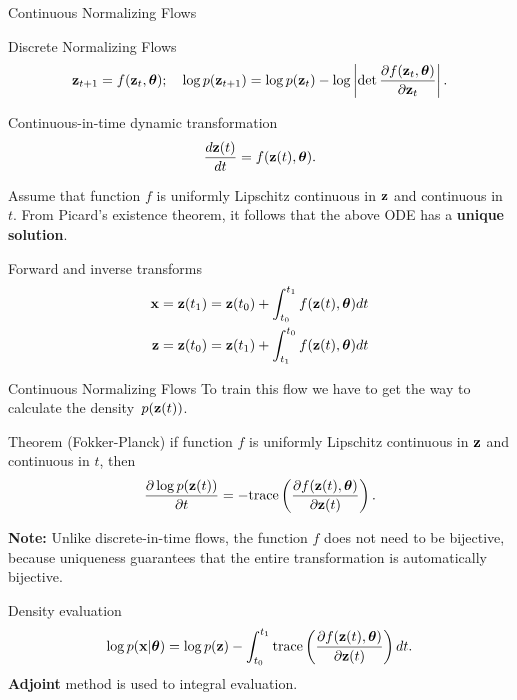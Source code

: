 \begin{frame}{Continuous Normalizing Flows}
	\begin{block}{Discrete Normalizing Flows}
		\vspace{-0.8cm}
		  \[
		  \mathbf{z}_{t+1} = f(\mathbf{z}_t, \boldsymbol{\theta}); \quad \log p(\mathbf{z}_{t+1}) = \log p(\mathbf{z}_{t}) - \log \left| \det \frac{\partial f(\mathbf{z}_t, \boldsymbol{\theta})}{\partial \mathbf{z}_{t}} \right| .
		  \]
		\vspace{-0.7cm}
	\end{block}
	\begin{block}{Continuous-in-time dynamic transformation}
		\vspace{-0.2cm}
		\[
			\frac{d\mathbf{z}(t)}{dt} = f(\mathbf{z}(t), \boldsymbol{\theta}).
		\]
		\vspace{-0.4cm}
	\end{block}
	Assume that function $f$ is uniformly Lipschitz continuous in $\mathbf{z}$ and continuous in $t$. From Picard’s existence theorem, it follows that the above ODE has a \textbf{unique solution}.
	\begin{block}{Forward and inverse transforms}
		\vspace{-0.7cm}
		\begin{align*}
			\mathbf{x} &= \mathbf{z}(t_1) = \mathbf{z}(t_0) + \int_{t_0}^{t_1} f(\mathbf{z}(t), \boldsymbol{\theta}) dt \\
			\mathbf{z} &= \mathbf{z}(t_0) = \mathbf{z}(t_1) + \int_{t_1}^{t_0} f(\mathbf{z}(t), \boldsymbol{\theta}) dt \\
		\end{align*}
	\end{block}
\end{frame}
\begin{frame}{Continuous Normalizing Flows}
	To train this flow we have to get the way to calculate the density~$p(\mathbf{z}(t))$.
	\begin{block}{Theorem (Fokker-Planck)}
		if function $f$ is uniformly Lipschitz continuous in $\mathbf{z}$ and continuous in $t$, then
		\vspace{-0.3cm}
		\[
			\frac{\partial \log p(\mathbf{z}(t))}{\partial t} = - \text{trace} \left( \frac{\partial f (\mathbf{z}(t), \boldsymbol{\theta})}{\partial \mathbf{z}(t)} \right).
		\]
		\vspace{-0.5cm}
	\end{block}
	\textbf{Note:} Unlike discrete-in-time flows, the function $f$ does not need to be bijective, because uniqueness guarantees that the entire transformation is automatically bijective.
	\begin{block}{Density evaluation}
		\vspace{-0.4cm}
		\[
			\log p(\mathbf{x} | \boldsymbol{\theta}) = \log p(\mathbf{z}) - \int_{t_0}^{t_1} \text{trace}  \left( \frac{\partial f (\mathbf{z}(t), \boldsymbol{\theta})}{\partial \mathbf{z}(t)} \right) dt.
		\]
		\textbf{Adjoint} method is used to integral evaluation.
	\end{block}
\end{frame}
